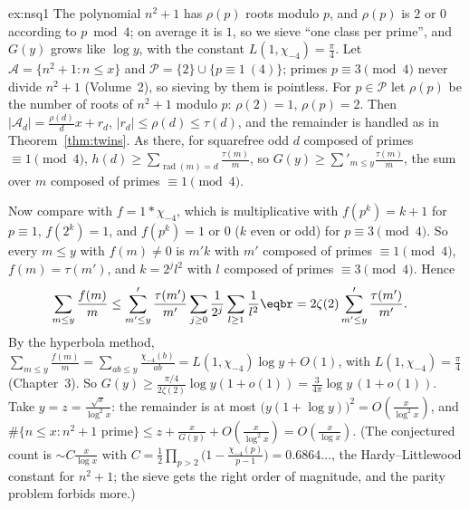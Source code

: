 \begin{solution}{ex:nsq1}
\idea The polynomial $n^2+1$ has $\rho(p)$ roots modulo $p$, and $\rho(p)$ is $2$ or $0$ according to $p\bmod4$; on average it is $1$, so we sieve ``one class per prime'', and $G(y)$ grows like $\log y$, with the constant $L(1,\chi_{-4})=\frac\pi4$.
\writeup Let $\mathcal A=\{n^2+1:n\le x\}$ and $\mathcal P=\{2\}\cup\{p\equiv1\ (4)\}$; primes $p\equiv3\pmod4$ never divide $n^2+1$ (Volume~2), so sieving by them is pointless. For $p\in\mathcal P$ let $\rho(p)$ be the number of roots of $n^2+1$ modulo
$p$: $\rho(2)=1$, $\rho(p)=2$. Then $|\mathcal A_d|=\frac{\rho(d)}dx+r_d$, $|r_d|\le\rho(d)\le\tau(d)$, and the remainder is handled as in Theorem~\ref{thm:twins}. As there, for squarefree odd $d$ composed of primes $\equiv1\pmod4$,
$h(d)\ge\sum_{\operatorname{rad}(m)=d}\frac{\tau(m)}m$, so $G(y)\ge\sum'_{m\le y}\frac{\tau(m)}m$, the sum over $m$ composed of primes $\equiv1\pmod4$.

Now compare with $f=1*\chi_{-4}$, which is multiplicative with $f(p^k)=k+1$ for $p\equiv1$, $f(2^k)=1$, and $f(p^k)=1$ or $0$ ($k$ even or odd) for $p\equiv3\pmod4$. So every $m\le y$ with $f(m)\ne0$ is $m'k$ with $m'$ composed of primes
$\equiv1\pmod4$, $f(m)=\tau(m')$, and $k=2^jl^2$ with $l$ composed of primes $\equiv3\pmod4$. Hence
\[
\begin{aligned}\sum_{m\le y}\frac{f(m)}m&\le\sum'_{m'\le y}\frac{\tau(m')}{m'}\sum_{j\ge0}\frac1{2^j}\sum_{l\ge1}\frac1{l^2}\eqbr=2\zeta(2)\sum'_{m'\le y}\frac{\tau(m')}{m'}.\end{aligned}
\]
By the hyperbola method, $\sum_{m\le y}\frac{f(m)}m=\sum_{ab\le y}\frac{\chi_{-4}(b)}{ab}=L(1,\chi_{-4})\log y+O(1)$, with $L(1,\chi_{-4})=\frac\pi4$ (Chapter~3). So $G(y)\ge\frac{\pi/4}{2\zeta(2)}\log y(1+o(1))=\frac3{4\pi}\log y\,(1+o(1))$.
Take $y=z=\frac{\sqrt x}{\log^2x}$: the remainder is at most $\bigl(y(1+\log y)\bigr)^2=O(\frac x{\log^2x})$, and
$\#\{n\le x:n^2+1\text{ prime}\}\le z+\frac x{G(y)}+O(\frac x{\log^2x})=O(\frac x{\log x})$. (The conjectured count is $\sim C\frac x{\log x}$ with $C=\frac12\prod_{p>2}\bigl(1-\frac{\chi_{-4}(p)}{p-1}\bigr)=0.6864\ldots$, the
Hardy--Littlewood constant for $n^2+1$; the sieve gets the right order of magnitude, and the parity problem forbids more.)
\end{solution}

